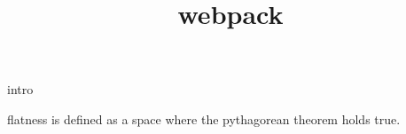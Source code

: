 \documentclass{article}
\title{webpack}
\newenvironment{andrew_section}[1]
    {
    \section{#1}
    \begin{itemize}
    }
    {
    \end{itemize}
    }
\begin{document}
\maketitle

\begin{andrew_section}{intro}
    \item flatness is defined as a space where the pythagorean theorem holds true.
\end{andrew_section}
\end{document}

